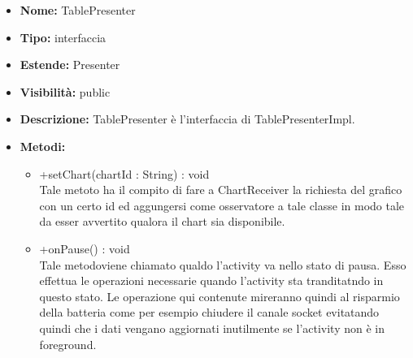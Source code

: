 	
			
			\begin{itemize}
			\item \textbf{Nome:} TablePresenter
			\item \textbf{Tipo:} interfaccia
			
		\item \textbf{Estende:}
		Presenter
			\item \textbf{Visibilità:} public
			\item \textbf{Descrizione:} TablePresenter è l'interfaccia di TablePresenterImpl.
			\item \textbf{Metodi:}
				\begin{itemize}
				\setlength{\itemsep}{5pt}
				
					\item[\ding{111}] {{+setChart(chartId : String) : void}} \\ [1mm] Tale metoto ha il compito di fare a ChartReceiver la richiesta del grafico con un certo id ed aggungersi come osservatore a tale classe in modo tale da esser avvertito qualora il chart sia disponibile.
					\item[\ding{111}] {{+onPause() : void}} \\ [1mm] Tale metodoviene chiamato qualdo l'activity va nello stato di pausa. Esso effettua le operazioni necessarie quando l'activity sta tranditatndo in questo stato. Le operazione qui contenute mireranno quindi al risparmio della batteria come per esempio chiudere il canale socket evitatando quindi che i dati vengano aggiornati inutilmente se l'activity non è in foreground.
				\end{itemize}
		
			\end{itemize}

